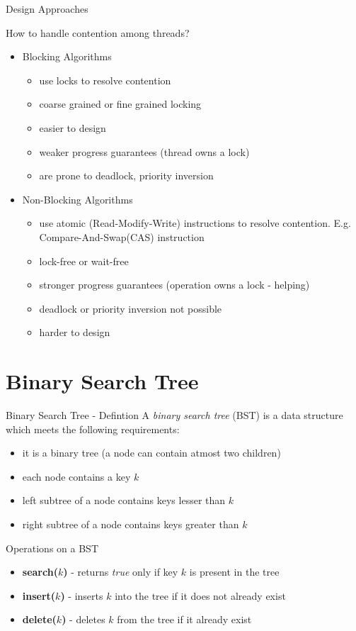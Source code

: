 \documentclass{beamer}
\begin{document}
\begin{frame}{Design Approaches}
\begin{center}
\Large How to handle contention among threads?
\end{center}
\pause
\begin{itemize}
\item<2-> \Large Blocking Algorithms
\begin{itemize}
\item<3-> use locks to resolve contention
\item<3-> coarse grained or fine grained locking
\item<3->  {\color{black!50!green} easier to design}
\item<3->  {\color{red}weaker progress guarantees} (thread owns a lock) 
\item<3->  {\color{red}are prone to deadlock, priority inversion}
\end{itemize}
\phantom{hello world}
\item<2-> \Large Non-Blocking Algorithms
\begin{itemize}
\item<4->  use atomic (Read-Modify-Write) instructions to resolve contention. E.g. Compare-And-Swap(CAS) instruction
\item<4-> lock-free or wait-free
\item<4-> {\color{black!50!green}stronger progress guarantees} (operation owns a lock - helping)
\item<4-> {\color{black!50!green}deadlock or priority inversion not possible}
\item<4-> {\color{red}harder to design}
\end{itemize}
\end{itemize}
\end{frame}

\section{Binary Search Tree}
\begin{frame}{Binary Search Tree - Defintion}
A \textit{binary search tree} (BST) is a data structure which meets the following requirements:
\begin{itemize}
\item it  is a binary tree (a node can contain atmost two children)
\item each node contains a key $k$
\item left subtree of a node contains keys lesser than $k$
\item right subtree of a node contains keys greater than $k$
\end{itemize}
\pause
Operations on a BST
\begin{itemize}
\item \textbf{search($k$)} - returns \textit{true} only if key $k$ is present in the tree
\item \textbf{insert($k$)} - inserts $k$ into the tree if it does not already exist
\item \textbf{delete($k$)} - deletes $k$ from the tree if it already exist
\end{itemize}
\end{frame}
\end{document}
